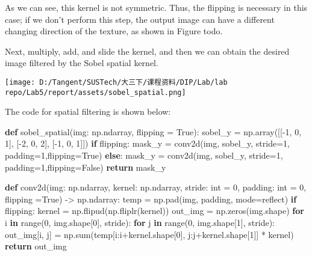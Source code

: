 \documentclass[
]{article}
\newenvironment{Shaded}{}{}
\newcommand{\BuiltInTok}[1]{\textcolor[rgb]{0.00,0.50,0.00}{#1}}
\newcommand{\ControlFlowTok}[1]{\textcolor[rgb]{0.00,0.44,0.13}{\textbf{#1}}}
\newcommand{\DecValTok}[1]{\textcolor[rgb]{0.25,0.63,0.44}{#1}}
\newcommand{\KeywordTok}[1]{\textcolor[rgb]{0.00,0.44,0.13}{\textbf{#1}}}
\newcommand{\NormalTok}[1]{#1}
\newcommand{\OperatorTok}[1]{\textcolor[rgb]{0.40,0.40,0.40}{#1}}
\newcommand{\StringTok}[1]{\textcolor[rgb]{0.25,0.44,0.63}{#1}}
\newcommand{\VariableTok}[1]{\textcolor[rgb]{0.10,0.09,0.49}{#1}}
\begin{document}
As we can see, this kernel is not symmetric. Thus, the flipping is
necessary in this case; if we don't perform this step, the output image
can have a different changing direction of the texture, as shown in
Figure todo.

Next, multiply, add, and slide the kernel, and then we can obtain the
desired image filtered by the Sobel spatial kernel.

\texttt{[image: D:/Tangent/SUSTech/大三下/课程资料/DIP/Lab/lab repo/Lab5/report/assets/sobel\_spatial.png]}

The code for spatial filtering is shown below:

\begin{Shaded}
\begin{Highlighting}[]
\KeywordTok{def}\NormalTok{ sobel\_spatial(img: np.ndarray, flipping }\OperatorTok{=} \VariableTok{True}\NormalTok{):}
\NormalTok{    sobel\_y }\OperatorTok{=}\NormalTok{ np.array([[}\OperatorTok{{-}}\DecValTok{1}\NormalTok{, }\DecValTok{0}\NormalTok{, }\DecValTok{1}\NormalTok{], [}\OperatorTok{{-}}\DecValTok{2}\NormalTok{, }\DecValTok{0}\NormalTok{, }\DecValTok{2}\NormalTok{], [}\OperatorTok{{-}}\DecValTok{1}\NormalTok{, }\DecValTok{0}\NormalTok{, }\DecValTok{1}\NormalTok{]])}
    \ControlFlowTok{if}\NormalTok{ flipping:}
\NormalTok{        mask\_y }\OperatorTok{=}\NormalTok{ conv2d(img, sobel\_y, stride}\OperatorTok{=}\DecValTok{1}\NormalTok{, padding}\OperatorTok{=}\DecValTok{1}\NormalTok{,flipping}\OperatorTok{=}\VariableTok{True}\NormalTok{)}
    \ControlFlowTok{else}\NormalTok{:}
\NormalTok{        mask\_y }\OperatorTok{=}\NormalTok{ conv2d(img, sobel\_y, stride}\OperatorTok{=}\DecValTok{1}\NormalTok{, padding}\OperatorTok{=}\DecValTok{1}\NormalTok{,flipping}\OperatorTok{=}\VariableTok{False}\NormalTok{)}
    \ControlFlowTok{return}\NormalTok{ mask\_y}

\KeywordTok{def}\NormalTok{ conv2d(img: np.ndarray, kernel: np.ndarray, stride: }\BuiltInTok{int} \OperatorTok{=} \DecValTok{0}\NormalTok{, padding: }\BuiltInTok{int} \OperatorTok{=} \DecValTok{0}\NormalTok{, flipping }\OperatorTok{=}\VariableTok{True}\NormalTok{) }\OperatorTok{{-}\textgreater{}}\NormalTok{ np.ndarray:}
\NormalTok{    temp }\OperatorTok{=}\NormalTok{ np.pad(img, padding, mode}\OperatorTok{=}\StringTok{\textquotesingle{}reflect\textquotesingle{}}\NormalTok{)}
    \ControlFlowTok{if}\NormalTok{ flipping:}
\NormalTok{        kernel }\OperatorTok{=}\NormalTok{ np.flipud(np.fliplr(kernel))}
\NormalTok{    out\_img }\OperatorTok{=}\NormalTok{ np.zeros(img.shape)}
    \ControlFlowTok{for}\NormalTok{ i }\KeywordTok{in} \BuiltInTok{range}\NormalTok{(}\DecValTok{0}\NormalTok{, img.shape[}\DecValTok{0}\NormalTok{], stride):}
        \ControlFlowTok{for}\NormalTok{ j }\KeywordTok{in} \BuiltInTok{range}\NormalTok{(}\DecValTok{0}\NormalTok{, img.shape[}\DecValTok{1}\NormalTok{], stride):}
\NormalTok{            out\_img[i, j] }\OperatorTok{=}\NormalTok{ np.}\BuiltInTok{sum}\NormalTok{(temp[i:i}\OperatorTok{+}\NormalTok{kernel.shape[}\DecValTok{0}\NormalTok{], j:j}\OperatorTok{+}\NormalTok{kernel.shape[}\DecValTok{1}\NormalTok{]] }\OperatorTok{*}\NormalTok{ kernel)}
    \ControlFlowTok{return}\NormalTok{ out\_img}
\end{Highlighting}
\end{Shaded}
\end{document}

